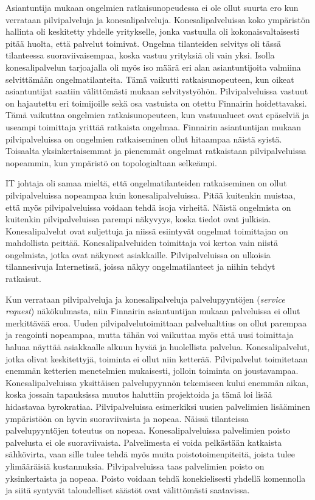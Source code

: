 Asiantuntija mukaan ongelmien ratkaisunopeudessa ei ole ollut suurta ero kun verrataan pilvipalveluja ja konesalipalveluja. Konesalipalveluissa koko ympäristön hallinta oli keskitetty yhdelle yritykselle, jonka vastuulla oli kokonaisvaltaisesti pitää huolta, että palvelut toimivat. Ongelma tilanteiden selvitys oli tässä tilanteessa suoraviivaisempaa, koska vastuu yrityksiä oli vain yksi. Isolla konesalipalvelun tarjoajalla oli myös iso määrä eri alan asiantuntijoita valmiina selvittämään ongelmatilanteita. Tämä vaikutti ratkaisunopeuteen, kun oikeat asiantuntijat saatiin välittömästi mukaan selvitystyöhön. Pilvipalveluissa vastuut on hajautettu eri toimijoille sekä osa vastuista on otettu Finnairin hoidettavaksi. Tämä vaikuttaa ongelmien ratkaisunopeuteen, kun vastuualueet ovat epäselviä ja useampi toimittaja yrittää ratkaista ongelmaa. Finnairin asiantuntijan mukaan pilvipalveluissa on ongelmien ratkaiseminen ollut hitaampaa näistä syistä. Toisaalta yksinkertaisemmat ja pienemmät ongelmat ratkaistaan pilvipalveluissa nopeammin, kun ympäristö on topologialtaan selkeämpi.

IT johtaja oli samaa mieltä, että ongelmatilanteiden ratkaiseminen on ollut pilvipalveluissa nopeampaa kuin konesalipalveluissa. Pitää kuitenkin muistaa, että myös pilvipalveluissa voidaan tehdä isoja virheitä. Näistä ongelmista on kuitenkin pilvipalveluissa parempi näkyvyys, koska tiedot ovat julkisia. Konesalipalvelut ovat suljettuja ja niissä esiintyvät ongelmat toimittajan on mahdollista peittää. Konesalipalveluiden toimittaja voi kertoa vain niistä ongelmista, jotka ovat näkyneet asiakkaille. Pilvipalveluissa on ulkoisia tilannesivuja Internetissä, joissa näkyy ongelmatilanteet ja niihin tehdyt ratkaisut.

Kun verrataan pilvipalveluja ja konesalipalveluja palvelupyyntöjen (\emph{service request}) näkökulmasta, niin Finnairin asiantuntijan mukaan palveluissa ei ollut merkittävää eroa. Uuden pilvipalvelutoimittaan palvelualttius on ollut parempaa ja reagointi nopeampaa, mutta tähän voi vaikuttaa myös että uusi toimittaja haluaa näyttää asiakkaalle alkuun hyvää ja huolellista palvelua. Konesalipalvelut, jotka olivat keskitettyjä, toiminta ei ollut niin ketterää. Pilvipalvelut toimitetaan enemmän ketterien menetelmien mukaisesti, jolloin toiminta on joustavampaa. Konesalipalveluissa yksittäisen palvelupyynnön tekemiseen kului enemmän aikaa, koska jossain tapauksissa muutos haluttiin projektoida ja tämä loi lisää hidastavaa byrokratiaa. Pilvipalveluissa esimerkiksi uusien palvelimien lisääminen ympäristöön on hyvin suoraviivaista ja nopeaa. Näissä tilanteissa palvelupyyntöjen toteutus on nopeaa. Konesalipalveluissa palvelimien poisto palvelusta ei ole suoraviivaista. Palvelimesta ei voida pelkästään katkaista sähkövirta, vaan sille tulee tehdä myös muita poistotoimenpiteitä, joista tulee ylimääräisiä kustannuksia. Pilvipalveluissa taas palvelimien poisto on yksinkertaista ja nopeaa. Poisto voidaan tehdä konekielisesti yhdellä komennolla ja siitä syntyvät taloudelliset säästöt ovat välittömästi saatavissa.

